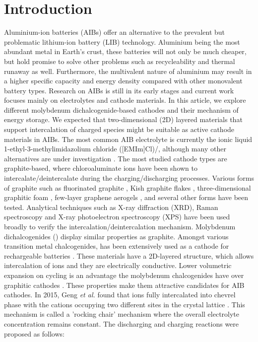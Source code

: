 \section{Introduction}
Aluminium-ion batteries (AIBs) offer an alternative to the prevalent but problematic lithium-ion battery (LIB) technology. Aluminium being the most abundant metal in Earth’s crust, these batteries will not only be much cheaper, but hold promise to solve other problems such as recycleability and thermal runaway as well. Furthermore, the multivalent nature of aluminium may result in a higher specific capacity and energy density compared with other monovalent battery types. Research on AIBs is still in its early stages and current work focuses mainly on electrolytes and cathode materials. In this article, we explore different molybdenum dichalcogenide-based cathodes and their mechanism of energy storage. We expected that two-dimensional (2D) layered materials that support intercalation of charged species might be suitable as active cathode materials in AIBs.
The most common AIB electrolyte is currently the ionic liquid 1-ethyl-3-methylimidazolium chloride ([EMIm]Cl)/, although many other alternatives are under investigation \cite{canever_acetamide_2018}. The most studied cathode types are graphite-based, where chloroaluminate ions  have been shown to intercalate/deintercalate during the charging/discharging processes. Various forms of graphite such as fluorinated graphite \cite{rani_fluorinated_2013}, Kish graphite flakes \cite{wang_kish_2017}, three-dimensional graphitic foam \cite{lin_ultrafast_2015}, few-layer graphene aerogels \cite{qiao_defect-free_2019}, and several other forms have been tested. Analytical techniques such as X-ray diffraction (XRD), Raman spectroscopy and X-ray photoelectron spectroscopy (XPS) have been used broadly to verify the intercalation/deintercalation mechanism. 
Molybdenum dichalcogenides () display similar properties as graphite. Amongst various transition metal chalcogenides,  has been extensively used as a cathode for rechargeable batteries \cite{li_mos2_2004, zhu_fast_2015}. These materials have a 2D-layered structure, which allows intercalation of ions and they are electrically conductive. Lower volumetric expansion on cycling is an advantage the molybdenum chalcogenides have over graphitic cathodes \cite{liang_rechargeable_2011, huang_molybdenum_2019}. These properties make them attractive candidates for AIB cathodes. In 2015, Geng \textit{et al.} found that  ions fully intercalated into chevrel phase  with the cations occupying two different sites in the crystal lattice \cite{geng_reversible_2015}. This mechanism is called a 'rocking chair' mechanism where the overall electrolyte concentration remains constant. The discharging and charging reactions were proposed as follows:
